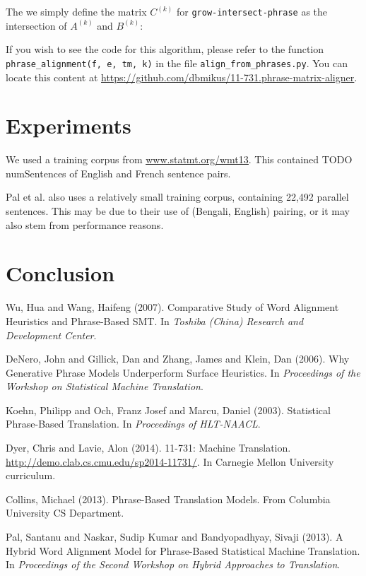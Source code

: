 \documentclass[twocolumn]{article}
\newcommand{\phraseIntersectAlign}{\texttt{grow-intersect-phrase}}
\begin{document}
The we simply define the matrix $C^{(k)}$ for \phraseIntersectAlign{}
as the intersection of $A^{(k)}$ and $B^{(k)}$:
\wrapSmall{\intersectMatrix{}}


If you wish to see the code for this algorithm, please refer to
the function \verb!phrase_alignment(f, e, tm, k)!
in the file \verb!align_from_phrases.py!.
You can locate this content at
\href{https://github.com/dbmikus/11-731.phrase-matrix-aligner}
     {\underline{https://github.com/dbmikus/11-731.phrase-matrix-aligner}}.

\section{Experiments}
We used a training corpus from
\href{http://www.statmt.org/wmt13/training-parallel-nc-v8.tgz}
     {\underline{www.statmt.org/wmt13}}.
This contained TODO numSentences of English and French sentence pairs.

Pal et al. \cite{pnb2013} also uses a relatively small training corpus,
containing 22,492 parallel sentences. This may be due to their use of
(Bengali, English) pairing, or it may also stem from performance reasons.


\section{Conclusion}


\begin{thebibliography}{99}
    Wu, Hua and Wang, Haifeng
    (2007).
    Comparative Study of Word Alignment Heuristics and Phrase-Based SMT.
    In \emph{Toshiba (China) Research and
      Development Center}.

    DeNero, John and Gillick, Dan and Zhang, James and Klein, Dan
    (2006).
    Why Generative Phrase Models Underperform Surface Heuristics.
    In \emph{Proceedings of the Workshop on Statistical Machine Translation}.

    Koehn, Philipp and Och, Franz Josef and Marcu, Daniel
    (2003).
    Statistical Phrase-Based Translation.
    In \emph{Proceedings of HLT-NAACL}.

    Dyer, Chris and Lavie, Alon
    (2014).
    11-731: Machine Translation.
    \href{http://demo.clab.cs.cmu.edu/sp2014-11731/}
     {\underline{http://demo.clab.cs.cmu.edu/sp2014-11731/}}.
    In Carnegie Mellon University curriculum.

    Collins, Michael
    (2013).
    Phrase-Based Translation Models.
    From Columbia University CS Department.

    Pal, Santanu and Naskar, Sudip Kumar and Bandyopadhyay, Sivaji
    (2013).
    A Hybrid Word Alignment Model for Phrase-Based Statistical Machine
    Translation.
    In \emph{Proceedings of the Second Workshop on Hybrid Approaches to
      Translation}.
\end{thebibliography}
\end{document}
